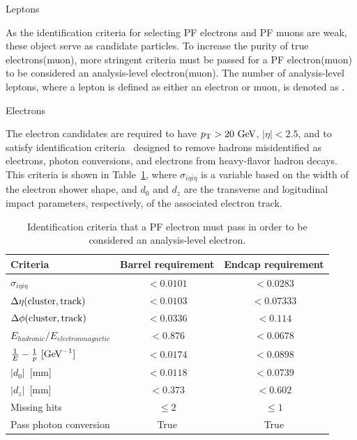 \begin{section}{Leptons}

As the identification criteria for selecting PF electrons and PF muons are weak, these object serve as candidate particles. 
To increase the purity of true electrons(muon), more stringent criteria must be passed for a PF electron(muon) to be considered an analysis-level electron(muon).
The number of analysis-level leptons, where a lepton is defined as either an electron or muon, is denoted as \Nleps.

\begin{subsection}{Electrons}

The electron candidates are required to have $p_{\mathrm{T}} > 20~\mathrm{Ge\kern -0.1em V}$, $|\eta| < 2.5$, and to satisfy identification criteria~\cite{electron_id} designed to remove hadrons misidentified as electrons, photon conversions, and electrons from heavy-flavor hadron decays. 
This criteria is shown in Table~\ref{tab:electron_id}, where $\sigma_{i\eta i\eta}$ is a variable based on the width of the electron shower shape, and $d_0$ and $d_z$ are the transverse and logitudinal impact parameters, respectively, of the associated electron track.

\begin{table}[tb!]
\centering
\begin{tabular}{l|cc}
\hline \hline
Criteria                                 &  Barrel requirement  & Endcap requirement \\
\hline
$\sigma_{i\eta i\eta}$                   &  $< 0.0101$          &  $< 0.0283 $       \\
$\Delta\eta\mathrm{(cluster,track)}$        &  $< 0.0103$          &  $< 0.07333$       \\
$\Delta\phi\mathrm{(cluster,track)}$        &  $< 0.0336$          &  $< 0.114  $       \\
$E_{hadronic}/E_{electronmagnetic}$      &  $< 0.876 $          &  $< 0.0678 $       \\
$\frac{1}{E} - \frac{1}{p}~[\mathrm{Ge\kern -0.1em V}^{-1}]$  &  $< 0.0174$          &  $< 0.0898 $       \\
$|d_0|$~[mm]                             &  $< 0.0118$          &  $< 0.0739 $       \\
$|d_z|$~[mm]                             &  $< 0.373 $          &  $< 0.602  $       \\
Missing hits                             &  $\leq 2  $          &  $\leq 1   $       \\
Pass photon conversion                   & True                 & True               \\
\hline \hline
\end{tabular}
\caption{Identification criteria that a PF electron must pass in order to be considered an analysis-level electron.}
\label{tab:electron_id}
\end{table}


\end{subsection}
\end{section}
